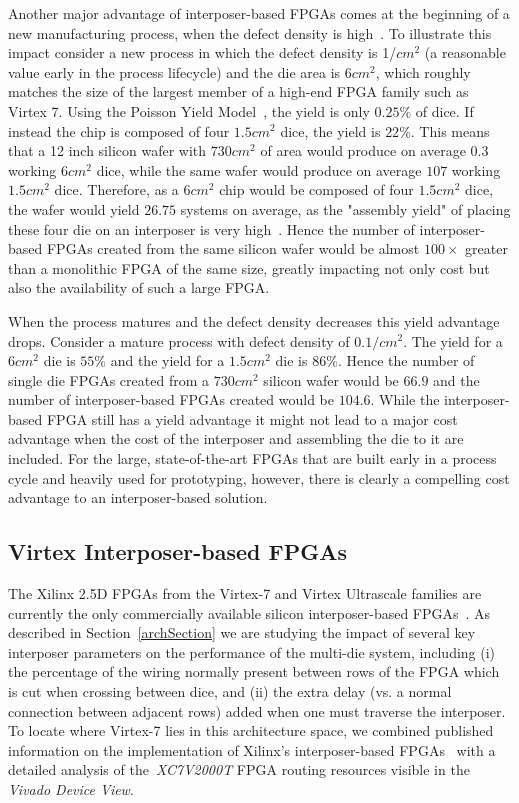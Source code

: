 \documentclass[journal]{IEEEtran}
\begin{document}
Another major advantage of interposer-based FPGAs comes at the beginning of a new manufacturing process, when the defect density is high~\cite{xilinxTSVperformance}. To illustrate this impact consider a new process in which the defect density is 1/$cm^2$ (a reasonable value early in the process lifecycle) and the die area is $6cm^2$, which roughly matches the size of the largest member of a high-end FPGA family such as Virtex 7. Using the Poisson Yield Model~\cite{yieldmodel}, the yield is only $0.25\%$ of dice. If instead the chip is composed of four $1.5cm^2$ dice, the yield is $22\%$. This means that a 12 inch silicon wafer with $730cm^2$ of area would produce on average $0.3$ working $6cm^2$ dice, while the same wafer would produce on average $107$ working $1.5cm^2$ dice. Therefore, as a $6cm^2$ chip would be composed of four $1.5cm^2$ dice, the wafer would yield $26.75$ systems on average, as the "assembly yield" of placing these four die on an interposer is very high~\cite{xilinxTSV}. Hence the number of interposer-based FPGAs created from the same silicon wafer would be almost $100\times$ greater than a monolithic FPGA of the same size, greatly impacting not only cost but also the availability of such a large FPGA.

When the process matures and the defect density decreases this yield advantage drops. Consider a mature process with defect density of $0.1/cm^2$. The yield for a $6cm^2$ die is $55\%$ and the yield for a $1.5cm^2$ die is $86\%$. Hence the number of single die FPGAs created from a $730cm^2$ silicon wafer would be $66.9$ and the number of interposer-based FPGAs created would be $104.6$. While the interposer-based FPGA still has a yield advantage it might not lead to a major cost advantage when the cost of the interposer and assembling the die to it are included. For the large, state-of-the-art FPGAs that are built early in a process cycle and heavily used for prototyping, however, there is clearly a compelling cost advantage to an interposer-based solution.

\subsection{Virtex Interposer-based FPGAs}
\label{virtex7section}

The Xilinx 2.5D FPGAs from the Virtex-7 and Virtex Ultrascale families are currently the only commercially available silicon interposer-based FPGAs~\cite{xilinxWP}. As described in Section~\ref{archSection} we are studying the impact of several key interposer parameters on the performance of the multi-die system, including (i) the percentage of the wiring normally present between rows of the FPGA which is cut when crossing between dice, and (ii) the extra delay (vs. a normal connection between adjacent rows) added when one must traverse the interposer.  To locate where Virtex-7 lies in this architecture space, we combined published information on the implementation of Xilinx's interposer-based FPGAs~\cite{xilinxTSV} with a detailed analysis of the~\textit{XC7V2000T} FPGA routing resources visible in the \textit{Vivado Device View}.
\end{document}
